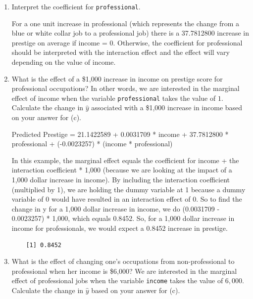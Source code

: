 \documentclass[12pt,letterpaper]{article}
\begin{document}
\begin{enumerate}
	\newpage
	\item [(e)]
	Interpret the coefficient for \texttt{professional}.
	
	\vspace{.1cm}

	\noindent For a one unit increase in professional (which represents the change from a blue or white collar job to a professional job) there is a 37.7812800 increase in prestige on average if income = 0. Otherwise, the coefficient for professional should be interpreted with the interaction effect and the effect will vary depending on the value of income.
	
	\item [(f)]
	What is the effect of a \$1,000 increase in income on prestige score for professional occupations? In other words, we are interested in the marginal effect of income when the variable \texttt{professional} takes the value of $1$. Calculate the change in $\hat{y}$ associated with a \$1,000 increase in income based on your answer for (c).
	
	\vspace{.1cm}
	
	\noindent Predicted Prestige = 21.1422589 + 0.0031709 * income + 37.7812800  * professional + (-0.0023257) * (income * professional)
	
	\noindent In this example, the marginal effect equals the coefficient for income + the interaction coefficient * 1,000 (because we are looking at the impact of a 1,000 dollar increase in income). By including the interaction coefficient (multiplied by 1), we are holding the dummy variable at 1 because a dummy variable of 0 would have resulted in an interaction effect of 0. So to find the change in y for a 1,000 dollar increase in income, we do (0.0031709 - 0.0023257) * 1,000, which equals 0.8452. So, for a 1,000 dollar increase in income for professionals, we would expect a 0.8452 increase in prestige.
	
	
	\begin{verbatim}
	[1] 0.8452
	\end{verbatim}
	
	\item [(g)]
	What is the effect of changing one's occupations from non-professional to professional when her income is \$6,000? We are interested in the marginal effect of professional jobs when the variable \texttt{income} takes the value of $6,000$. Calculate the change in $\hat{y}$ based on your answer for (c).
	

\end{enumerate}
\end{document}
